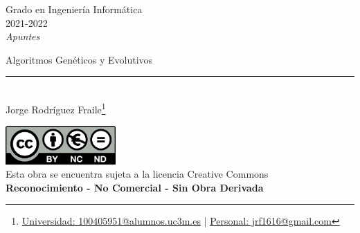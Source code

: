 \documentclass[12pt, twoside, openright]{report} %
\begin{document}

\begin{titlepage}
	\begin{sffamily}
		\color{azulUC3M}
		\begin{center}
			\begin{figure}[H] %
			\end{figure}
			\vspace{2.5cm}
			\begin{Large}
				Grado en Ingeniería Informática\\
				2021-2022\\
				\vspace{2cm}
				\textsl{Apuntes}\\
				\bigskip
			\end{Large}
			{\Huge Algoritmos Genéticos y Evolutivos}\\
			\vspace*{0.5cm}
			\rule{10.5cm}{0.1mm}\\
			\vspace*{0.9cm}
			{\LARGE Jorge Rodríguez Fraile\footnote{\href{mailto:100405951@alumnos.uc3m.es}{Universidad: 100405951@alumnos.uc3m.es}  |  \href{mailto:jrf1616@gmail.com}{Personal: jrf1616@gmail.com}}}\\
			\vspace*{1cm}
		\end{center}
		\vfill
		\color{black}
		\includegraphics[width=4.2cm]{img/creativecommons.png}\\
		Esta obra se encuentra sujeta a la licencia Creative Commons\\ \textbf{Reconocimiento - No Comercial - Sin Obra Derivada}
	\end{sffamily}
\end{titlepage}


\tableofcontents
\thispagestyle{fancy}
\end{document}
